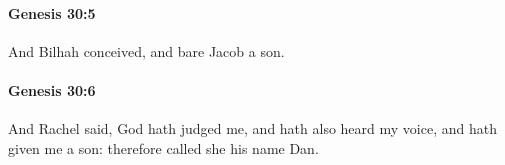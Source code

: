 		\paragraph{Genesis 30:5} %
			\label{GENESIS-30-5}

			And Bilhah conceived, and bare Jacob a son.


		\paragraph{Genesis 30:6} %
			\label{GENESIS-30-6}

			And Rachel said, God hath judged me, and hath also heard my voice, and hath given me a son: therefore called she his name Dan.



